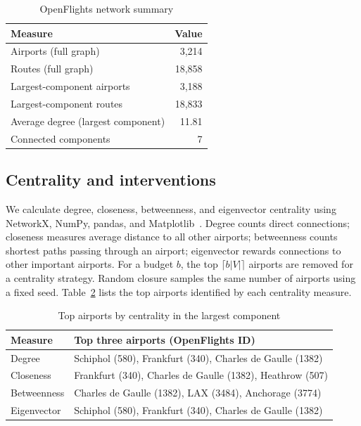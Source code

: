 \documentclass[conference]{IEEEtran}
\begin{document}
\begin{table}[t]
\caption{OpenFlights network summary}
\label{tab:network}
\centering
\begin{tabular}{lr}
\toprule
Measure & Value\\
\midrule
Airports (full graph) & 3,214\\
Routes (full graph) & 18,858\\
Largest-component airports & 3,188\\
Largest-component routes & 18,833\\
Average degree (largest component) & 11.81\\
Connected components & 7\\
\bottomrule
\end{tabular}
\end{table}

\subsection{Centrality and interventions}
We calculate degree, closeness, betweenness, and eigenvector centrality using NetworkX, NumPy, pandas, and Matplotlib~\cite{networkx,numpy,pandas,matplotlib}. Degree counts direct connections; closeness measures average distance to all other airports; betweenness counts shortest paths passing through an airport; eigenvector rewards connections to other important airports. For a budget $b$, the top $\lceil b|V|\rceil$ airports are removed for a centrality strategy. Random closure samples the same number of airports using a fixed seed. Table~\ref{tab:centrality} lists the top airports identified by each centrality measure.

\begin{table}[t]
\caption{Top airports by centrality in the largest component}
\label{tab:centrality}
\centering
\begin{tabular}{ll}
\toprule
Measure & Top three airports (OpenFlights ID)\\
\midrule
Degree & Schiphol (580), Frankfurt (340), Charles de Gaulle (1382)\\
Closeness & Frankfurt (340), Charles de Gaulle (1382), Heathrow (507)\\
Betweenness & Charles de Gaulle (1382), LAX (3484), Anchorage (3774)\\
Eigenvector & Schiphol (580), Frankfurt (340), Charles de Gaulle (1382)\\
\bottomrule
\end{tabular}
\end{table}
\end{document}
